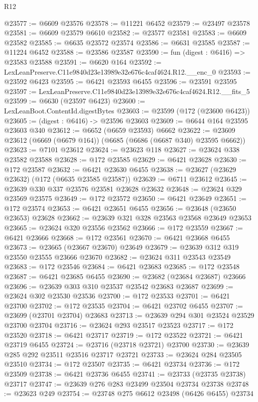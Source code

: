 \begin{lexlean}{R12}
\begin{coremodule}
@23577 := @6609 @23576
@23578 := @11221 @6452
@23579 := @23497 @23578
@23581 := @6609 @23579 @6610
@23582 := @23577 @23581
@23583 := @6609 @23582
@23585 := @6635 @23572 @23574
@23586 := @6631 @23585
@23587 := @11224 @6452
@23588 := @23586 @23587
@23590 := fun (digest : @6416) => @23583 @23588
@23591 := @6620 @164
@23592 := LexLeanPreserve.C11e9840d23e13989e32e676c4caf4624.R12.__enc_0
@23593 := @23592 @6423
@23595 := @6421 @23593 @6455
@23596 := @23591 @23595
@23597 := LexLeanPreserve.C11e9840d23e13989e32e676c4caf4624.R12.__fits_5
@23599 := @6630 (@23597 @6423)
@23600 := LexLeanBoot.ContentId.digestBytes
@23603 := @23599 (@172 (@23600 @6423))
@23605 := (digest : @6416) -> @23596 @23603
@23609 := @6644 @164 @23595 @23603 @340
@23612 := @6652 (@6659 @23593) @6662
@23622 := @23609 @23612 (@6669 (@6679 @164)) (@6685 (@6686 (@6687 @340) @23595 @6662))
@23623 := @7101 @23612
@23624 := @23623 @118
@23627 := @23624 @338 @23582 @23588
@23628 := @172 @23585
@23629 := @6421 @23628
@23630 := @172 @23587
@23632 := @6421 @23630 @6455
@23638 := @23627 (@23629 @23632) (@172 (@6635 @23585 @23587))
@23639 := @6711 @23612
@23645 := @23639 @330 @337 @23576 @23581 @23628 @23632
@23648 := @23624 @329 @23569 @23575
@23649 := @172 @23572
@23650 := @6421 @23649
@23651 := @172 @23574
@23653 := @6421 @23651 @6455
@23656 := @23648 (@23650 @23653) @23628
@23662 := @23639 @321 @328 @23563 @23568 @23649 @23653
@23665 := @23624 @320 @23556 @23562
@23666 := @172 @23559
@23667 := @6421 @23666
@23668 := @172 @23561
@23670 := @6421 @23668 @6455
@23673 := @23665 (@23667 @23670) @23649
@23679 := @23639 @312 @319 @23550 @23555 @23666 @23670
@23682 := @23624 @311 @23543 @23549
@23683 := @172 @23546
@23684 := @6421 @23683
@23685 := @172 @23548
@23687 := @6421 @23685 @6455
@23690 := @23682 (@23684 @23687) @23666
@23696 := @23639 @303 @310 @23537 @23542 @23683 @23687
@23699 := @23624 @302 @23530 @23536
@23700 := @172 @23533
@23701 := @6421 @23700
@23702 := @172 @23535
@23704 := @6421 @23702 @6455
@23707 := @23699 (@23701 @23704) @23683
@23713 := @23639 @294 @301 @23524 @23529 @23700 @23704
@23716 := @23624 @293 @23517 @23523
@23717 := @172 @23520
@23718 := @6421 @23717
@23719 := @172 @23522
@23721 := @6421 @23719 @6455
@23724 := @23716 (@23718 @23721) @23700
@23730 := @23639 @285 @292 @23511 @23516 @23717 @23721
@23733 := @23624 @284 @23505 @23510
@23734 := @172 @23507
@23735 := @6421 @23734
@23736 := @172 @23509
@23738 := @6421 @23736 @6455
@23741 := @23733 (@23735 @23738) @23717
@23747 := @23639 @276 @283 @23499 @23504 @23734 @23738
@23748 := @23623 @249
@23754 := @23748 @275 @6612 @23498 (@6426 @6455) @23734

\end{coremodule}
\end{lexlean}
